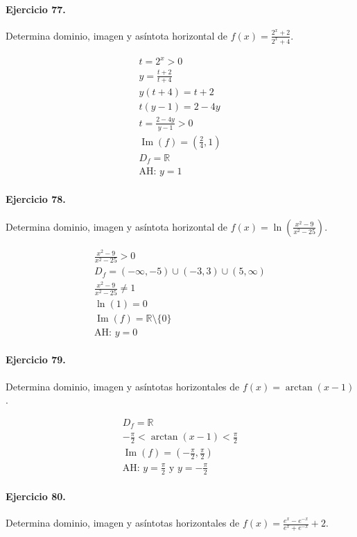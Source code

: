 \documentclass[11pt,a4paper]{article}
\begin{document}
\paragraph{Ejercicio 77.} Determina dominio, imagen y asíntota horizontal de $f(x)=\frac{2^x+2}{2^x+4}$. 

\[
\begin{aligned}
t=2^x>0\\
y=\frac{t+2}{t+4}\\
y(t+4)=t+2\\
t(y-1)=2-4y\\
t=\frac{2-4y}{y-1}>0\\
\operatorname{Im}(f)=(\frac{2}{4},1)\\
D_f=\mathbb{R}\\
\text{{AH: }}y=1
\end{aligned}
\]


\paragraph{Ejercicio 78.} Determina dominio, imagen y asíntota horizontal de $f(x)=\ln\left(\frac{x^2-9}{x^2-25}\right)$.

\[
\begin{aligned}
\frac{x^2-9}{x^2-25} >0\\
D_f=(-\infty,-5)\cup(-3,3)\cup(5,\infty)\\
\frac{x^2-9}{x^2-25}\ne1\\
\ln(1)=0\\
\operatorname{Im}(f)=\mathbb{R}\setminus\{0\}\\
\text{{AH: }}y=0
\end{aligned}
\]


\paragraph{Ejercicio 79.} Determina dominio, imagen y asíntotas horizontales de $f(x)=\arctan(x-1)$.

\[
\begin{aligned}
D_f=\mathbb{R}\\
-\frac{\pi}{2}<\arctan(x-1)<\frac{\pi}{2}\\
\operatorname{Im}(f)=\left(-\frac{\pi}{2},\frac{\pi}{2}\right)\\
\text{AH: }y=\frac{\pi}{2}\text{ y }y=-\frac{\pi}{2}
\end{aligned}
\]


\paragraph{Ejercicio 80.} Determina dominio, imagen y asíntotas horizontales de $f(x)=\frac{e^x-e^{-x}}{e^x+e^{-x}}+2$.
\end{document}
